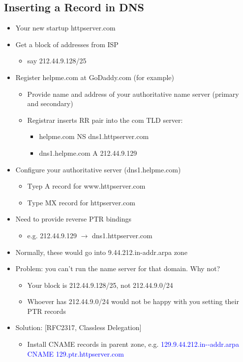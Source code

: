 \subsection{Inserting a Record in DNS}
\begin{itemize}[nosep]
    \item Your new startup httpserver.com
    \item Get a block of addresses from ISP
          \begin{itemize}[nosep]
              \item say 212.44.9.128/25
          \end{itemize}
    \item Register helpme.com at GoDaddy.com (for example)
          \begin{itemize}[nosep]
              \item Provide name and address of your authoritative name server (primary and secondary)
              \item Registrar inserts RR pair into the com TLD server:
                    \begin{itemize}[nosep]
                        \item helpme.com NS dns1.httpserver.com
                        \item dns1.helpme.com A 212.44.9.129
                    \end{itemize}
          \end{itemize}
    \item Configure your authoritative server (dns1.helpme.com)
          \begin{itemize}[nosep]
              \item Tyep A record for www.httpserver.com
              \item Type MX record for httpserver.com
          \end{itemize}
    \item Need to provide reverse PTR bindings
          \begin{itemize}[nosep]
              \item e.g. 212.44.9.129 $\rightarrow$ dns1.httpserver.com
          \end{itemize}
    \item Normally, these would go into 9.44.212.in-addr.arpa zone
    \item Problem: you can't run the name server for that domain. Why not?
          \begin{itemize}[nosep]
              \item Your block is 212.44.9.128/25, not 212.44.9.0/24
              \item Whoever has 212.44.9.0/24 would not be happy with you setting their PTR records
          \end{itemize}
    \item Solution: [RFC2317, Classless Delegation]
          \begin{itemize}[nosep]
              \item Install CNAME records in parent zone, e.g. \textcolor{blue}{129.9.44.212.in-­‐addr.arpa CNAME 129.ptr.httpserver.com}
          \end{itemize}
\end{itemize}
